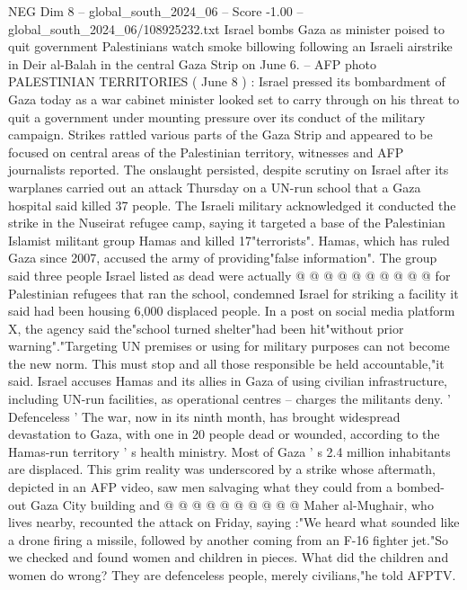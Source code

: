 \begin{textsample}{NEG Dim 8 – global\_south\_2024\_06 – Score -1.00 – global\_south\_2024\_06/108925232.txt}  \label{ex:f8_neg_040}
Israel bombs Gaza as minister poised to quit government Palestinians watch smoke billowing following an Israeli airstrike in Deir al-Balah in the central Gaza Strip on June 6. -- AFP photo PALESTINIAN TERRITORIES ( June 8 ) : Israel pressed its bombardment of Gaza today as a war cabinet minister looked set to carry through on his threat to quit a government under mounting pressure over its conduct of the military campaign.
Strikes rattled various parts of the Gaza Strip and appeared to be focused on central areas of the Palestinian territory, witnesses and AFP journalists reported.
The onslaught persisted, despite scrutiny on Israel after its warplanes carried out an attack Thursday on a UN-run school that a Gaza hospital said killed 37 people.
The Israeli military acknowledged it conducted the strike in the Nuseirat refugee camp, saying it targeted a base of the Palestinian Islamist militant group Hamas and killed 17"terrorists".
Hamas, which has ruled Gaza since 2007, accused the army of providing"false information".
The group said three people Israel listed as dead were actually @ @ @ @ @ @ @ @ @ @ for Palestinian refugees that ran the school, condemned Israel for striking a facility it said had been housing 6,000 displaced people.
In a post on social media platform X, the agency said the"school turned shelter"had been hit"without prior warning"."Targeting UN premises or using for military purposes can not become the new norm.
This must stop and all those responsible be held accountable,"it said.
Israel accuses Hamas and its allies in Gaza of using civilian infrastructure, including UN-run facilities, as operational centres -- charges the militants deny. ' Defenceless ' The war, now in its ninth month, has brought widespread devastation to Gaza, with one in 20 people dead or wounded, according to the Hamas-run territory ' s health ministry.
Most of Gaza ' s 2.4 million inhabitants are displaced.
This grim reality was underscored by a strike whose aftermath, depicted in an AFP video, saw men salvaging what they could from a bombed-out Gaza City building and @ @ @ @ @ @ @ @ @ @ Maher al-Mughair, who lives nearby, recounted the attack on Friday, saying :"We heard what sounded like a drone firing a missile, followed by another coming from an F-16 fighter jet."So we checked and found women and children in pieces.
What did the children and women do wrong?
They are defenceless people, merely civilians,"he told AFPTV.

\end{textsample}
